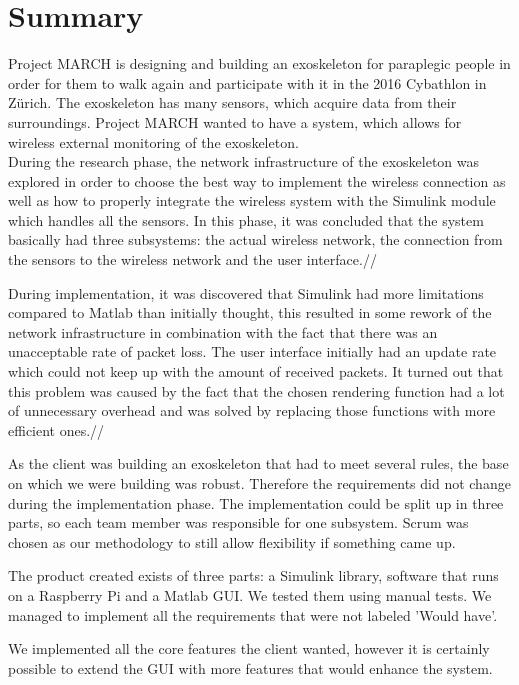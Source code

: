 \chapter*{Summary}
Project MARCH is designing and building an exoskeleton for paraplegic people in order for them to walk again and participate with it in the 2016 Cybathlon in Zürich.  
The exoskeleton has many sensors, which acquire data from their surroundings. Project MARCH wanted to have a system, which allows for wireless external monitoring of the exoskeleton. \\
During the research phase, the network infrastructure of the exoskeleton was explored in order to choose the best way to implement the wireless connection as well as how to properly integrate the wireless system with the Simulink module which handles all the sensors. In this phase, it was concluded that the system basically had three subsystems: the actual wireless network, the connection from the sensors to the wireless network and the user interface.//

During implementation, it was discovered that Simulink had more limitations compared to Matlab than initially thought, this resulted in some rework of the network infrastructure in combination with the fact that there was an unacceptable rate of packet loss. The user interface initially had an update rate which could not keep up with the amount of received packets. It turned out that this problem was caused by the fact that the chosen rendering function had a lot of unnecessary overhead and was solved by replacing those functions with more efficient ones.//

As the client was building an exoskeleton that had to meet several rules, the base on which we were building was robust. Therefore the requirements did not change during the implementation phase. The implementation could be split up in three parts, so each team member was responsible for one subsystem. Scrum was chosen as our methodology to still allow flexibility if something came up.

The product created exists of three parts: a Simulink library, software that runs on a Raspberry Pi and a Matlab GUI. We tested them using manual tests. We managed to implement all the requirements that were not labeled 'Would have'. 

We implemented all the core features the client wanted, however it is certainly possible to extend the GUI with more features that would enhance the system.	



